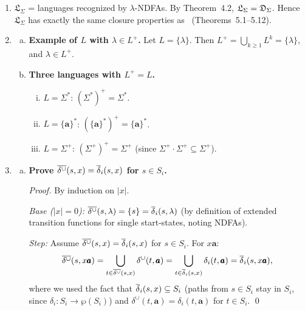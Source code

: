 \begin{enumerate}[{5.}1. ]
\begin{enumerate}[(a)]
  \item \textbf{Proof.}  By induction (as in Exercise~5.56/5.57), $\overline{\delta^-}(\langle s^1_0,s^2_0\rangle,x)=\langle\deltabar{1}(s^1_0,x),\deltabar{2}(s^2_0,x)\rangle$.  Then $x\in L(A^-)$ iff $\deltabar{1}(s^1_0,x)\in F_1$ and $\deltabar{2}(s^2_0,x)\notin F_2$ iff $x\in L_1\setminus L_2$. \qed
\end{enumerate}

\item $\mathfrak{L}_\Sigma$ = languages recognized by $\lambda$-NDFAs.  By Theorem~4.2, $\mathfrak{L}_\Sigma=\mathfrak{D}_\Sigma$.  Hence $\mathfrak{L}_\Sigma$ has exactly the same closure properties as \DSIG\ (Theorems~5.1--5.12).

\item \begin{enumerate}[(a)]
  \item \textbf{Example of $L$ with $\lambda\in L^+$.}  Let $L=\{\lambda\}$.  Then $L^+=\bigcup_{k\ge 1}L^k=\{\lambda\}$, and $\lambda\in L^+$.

  \item \textbf{Three languages with $L^+=L$.}
  \begin{enumerate}[(i)]
    \item $L=\Sigma^*$: $(\Sigma^*)^+=\Sigma^*$.
    \item $L=\{\pmb{a}\}^*$: $(\{\pmb{a}\}^*)^+=\{\pmb{a}\}^*$.
    \item $L=\Sigma^+$: $(\Sigma^+)^+=\Sigma^+$ (since $\Sigma^+\cdot\Sigma^+\subseteq\Sigma^+$).
  \end{enumerate}
\end{enumerate}

\item \begin{enumerate}[(a)]
  \item \textbf{Prove $\overline{\delta^\cup}(s,x)=\overline{\delta}_i(s,x)$ for $s\in S_i$.}

  \begin{proof}
  By induction on $|x|$.

  \emph{Base ($|x|=0$):}  $\overline{\delta^\cup}(s,\lambda)=\{s\}=\overline{\delta}_i(s,\lambda)$ (by definition of extended transition functions for single start-states, noting NDFAs).

  \emph{Step:}  Assume $\overline{\delta^\cup}(s,x)=\overline{\delta}_i(s,x)$ for $s\in S_i$.  For $x\pmb{a}$:
  \[
    \overline{\delta^\cup}(s,x\pmb{a})
    =\bigcup_{t\in\overline{\delta^\cup}(s,x)}\delta^\cup(t,\pmb{a})
    =\bigcup_{t\in\overline{\delta}_i(s,x)}\delta_i(t,\pmb{a})
    =\overline{\delta}_i(s,x\pmb{a}),
  \]
  where we used the fact that $\overline{\delta}_i(s,x)\subseteq S_i$ (paths from $s\in S_i$ stay in $S_i$, since $\delta_i:S_i\to\wp(S_i)$) and $\delta^\cup(t,\pmb{a})=\delta_i(t,\pmb{a})$ for $t\in S_i$. \qed
  \end{proof}


\end{enumerate}
\end{enumerate}
